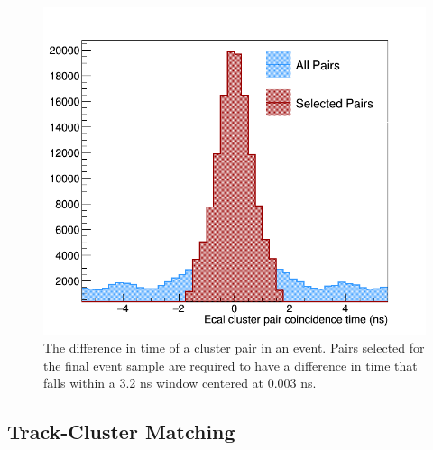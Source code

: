 \begin{figure}[h!t]
    \centering
    \includegraphics[width=.9\textwidth]{images/20160428_coincidence_time.png}
    \caption{The difference in time of a cluster pair in an event.  Pairs 
             selected for the final event sample are required to have a 
             difference in time that falls within a 3.2 ns window centered at 
             0.003 ns.}
    \label{fig:coin_time}
\end{figure}  
 
\subsection{Track-Cluster Matching}

